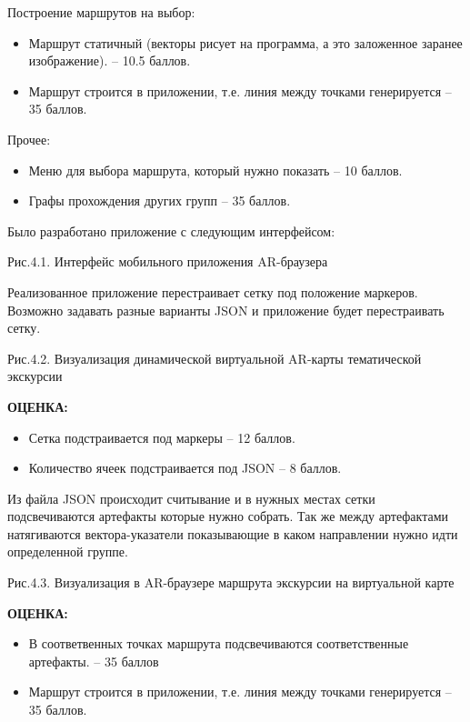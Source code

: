 Построение маршрутов на выбор:
\begin{itemize} 
    \item	Маршрут статичный (векторы рисует на программа, а это заложенное заранее изображение). – 10.5 баллов.
    \item	Маршрут строится в приложении, т.е. линия между точками генерируется – 35 баллов.
\end{itemize}
Прочее:
\begin{itemize}
    \item	Меню для выбора маршрута, который нужно показать – 10 баллов.
    \item	Графы прохождения других групп – 35 баллов.
\end{itemize}

\solutionSection
Было разработано приложение с следующим интерфейсом:

\begin{center}
    Рис.4.1. Интерфейс мобильного приложения AR-браузера
\end{center}

Реализованное приложение перестраивает сетку под положение маркеров. Возможно задавать разные варианты JSON и приложение будет перестраивать сетку.

\begin{center}
    Рис.4.2. Визуализация динамической виртуальной AR-карты тематической экскурсии
\end{center}

\textbf{ОЦЕНКА:}
\begin{itemize}
    \item	Сетка подстраивается под маркеры – 12 баллов. 
    \item	Количество ячеек подстраивается под JSON – 8 баллов.
\end{itemize}
Из файла JSON происходит считывание и в нужных местах сетки подсвечиваются артефакты которые нужно собрать. Так же между артефактами натягиваются вектора-указатели показывающие в каком направлении нужно идти определенной группе.

 
\begin{center}
    Рис.4.3. Визуализация в AR-браузере маршрута экскурсии на виртуальной карте
\end{center}

\textbf{ОЦЕНКА:}
\begin{itemize}
    \item	В соответвенных точках маршрута подсвечиваются соответственные 
артефакты. – 35 баллов
    \item	Маршрут строится в приложении, т.е. линия между точками 
генерируется – 35 баллов.
\end{itemize}